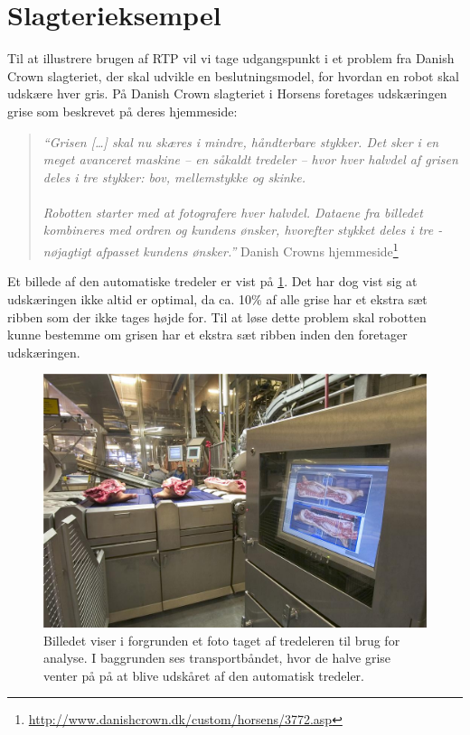 \section{Slagterieksempel}
Til at illustrere brugen af RTP vil vi tage udgangspunkt i et  problem fra Danish Crown slagteriet, der skal udvikle en beslutningsmodel, for hvordan en robot skal  udskære hver gris. På Danish Crown slagteriet i Horsens foretages udskæringen  grise som beskrevet på deres hjemmeside:

\begin{quote}\textit{``Grisen [\ldots] skal nu skæres i mindre, håndterbare stykker. Det sker i en meget avanceret maskine -- en såkaldt tredeler -- hvor hver halvdel af grisen deles i tre stykker: bov, mellemstykke og skinke. \\ 
\\
Robotten starter med at fotografere hver halvdel. Dataene fra billedet kombineres med ordren og kundens ønsker, hvorefter stykket deles i tre - nøjagtigt afpasset kundens ønsker.''}{ Danish Crowns hjemmeside\footnote{\url{http://www.danishcrown.dk/custom/horsens/3772.asp}}}\end{quote}

Et billede af den automatiske tredeler er vist  på \cref{fig:pig}.  Det har dog vist sig at udskæringen ikke  altid er optimal, da  ca. 10\% af alle grise har et ekstra sæt ribben som der ikke tages højde for. Til at løse dette problem skal robotten kunne bestemme om grisen har et ekstra sæt ribben inden den foretager udskæringen.

\begin{figure}
 \begin{center}
  \includegraphics[scale=0.5]{images/209690-1}
	\caption{Billedet viser i forgrunden  et foto taget af tredeleren til brug for analyse. I baggrunden ses transportbåndet, hvor de halve  grise venter på på at blive udskåret af den automatisk tredeler.}
	\label{fig:pig}
\end{center}
\end{figure}


